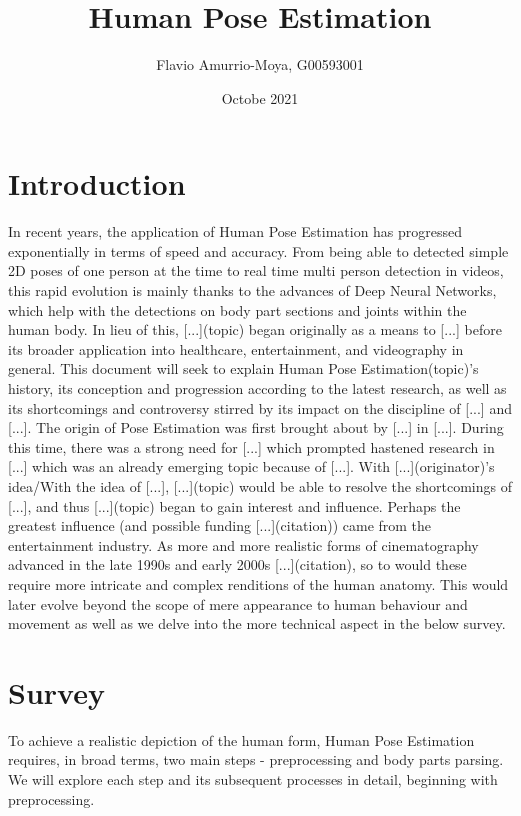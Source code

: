 \documentclass[12pt]{extarticle}
\title{Human Pose Estimation}
\author{Flavio Amurrio-Moya, G00593001}
\date{Octobe 2021}
\begin{document}
\maketitle



\section{Introduction}
In recent years, the application of Human Pose Estimation has progressed exponentially in terms of speed and accuracy.  From being able to detected simple 2D poses of one person at the time to real time multi person detection in videos, this rapid evolution is mainly thanks to the advances of Deep Neural Networks, which help with the detections on body part sections and joints within the human body. In lieu of this, [...](topic) began originally as a means to [...] before its broader application into healthcare, entertainment, and videography in general. This document will seek to explain Human Pose Estimation(topic)'s history, its conception and progression according to the latest research, as well as its shortcomings and controversy stirred by its impact on the discipline of [...] and [...].
The origin of Pose Estimation was first brought about by [...] in [...]. During this time, there was a strong need for [...] which prompted hastened research in [...] which was an already emerging topic because of [...]. With [...](originator)'s idea/With the idea of [...], [...](topic) would be able to resolve the shortcomings of [...], and thus [...](topic) began to gain interest and influence. Perhaps the greatest influence (and possible funding [...](citation)) came from the entertainment industry. As more and more realistic forms of cinematography advanced in the late 1990s and early 2000s [...](citation), so to would these require more intricate and complex renditions of the human anatomy. This would later evolve beyond the scope of mere appearance to human behaviour and movement as well as we delve into the more technical aspect in the below survey.

\section{Survey}
To achieve a realistic depiction of the human form, Human Pose Estimation requires, in broad terms, two main steps - preprocessing and body parts parsing. We will explore each step and its subsequent processes in detail, beginning with preprocessing.
\end{document}
